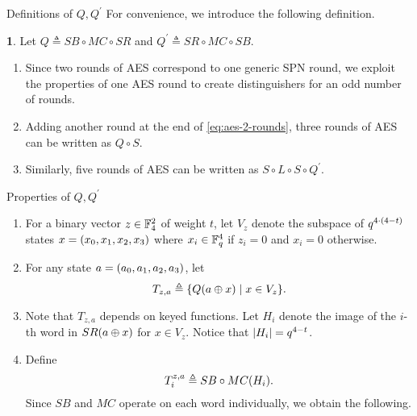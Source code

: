 \documentclass[notheorems]{beamer}
\theoremstyle{definition}
\newtheorem{definition}{\translate{Definition}}
\theoremstyle{example}
\begin{document}
    \begin{frame}{Definitions of \(Q, Q^\prime\)}
        For convenience, we introduce the following definition.
        \begin{definition}
            \label{def:q}
            Let \(Q \triangleq SB \circ MC \circ SR\) and \(Q^\prime \triangleq
            SR \circ MC \circ SB\).
        \end{definition}
        \begin{enumerate}
            \item<2-> Since two rounds of AES correspond to one generic SPN
            round, we exploit the properties of one AES round to create
            distinguishers for an odd number of rounds. 
            \item<3-> Adding another round at the end of
            \eqref{eq:aes-2-rounds}, three rounds of AES can be written as \(Q
            \circ S\).
            \item<4-> Similarly, five rounds of AES can be written as \(S \circ
            L \circ S \circ Q^\prime\).
        \end{enumerate}
    \end{frame}

    \begin{frame}[<+->]{Properties of \(Q, Q^\prime\)}
        \begin{enumerate}
            \item For a binary vector \(z \in \mathbb F_4^2\) of weight \(t\), let
            \(V_z\) denote the subspace of \(q^{4\cdot(4 - t)}\) states \(x
            = (x_0, x_1, x_2, x_3)\) where \(x_i \in \mathbb F_q^4\) if \(z_i =
            0\) and \(x_i = 0\) otherwise. 
            \item For any state \(a = (a_0, a_1, a_2, a_3)\), let
            \begin{equation}
                T_{z, a} \triangleq \{Q(a \oplus x) \mid x \in V_z\}.
                \label{eq:tza-def}
            \end{equation}
            \item Note that \(T_{z, a}\) depends on keyed functions. Let \(H_i\)
            denote the image of the \(i\)-th word in \(SR(a \oplus x)\) for
            \(x \in V_z\). Notice that \(\left\vert H_i\right\vert = q^{4 - t}\). 
            \item Define
            \begin{equation}
                T_i^{z, a} \triangleq SB \circ MC(H_i).
                \label{eq:tiza-def}
            \end{equation}
            Since \(SB\) and \(MC\) operate on each word individually, we obtain
            the following.
        \end{enumerate}
    \end{frame}
\end{document}
